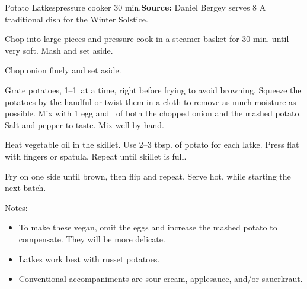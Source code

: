 \begin{recipe}{Potato Latkes}{pressure cooker \hfill 30 min.}{\textbf{Source:} Daniel Bergey \hfill serves 8}
  \freeform A traditional dish for the Winter Solstice.

Chop into large pieces and pressure cook in a steamer basket for 30 min. until very soft. Mash and set aside.

Chop onion finely and set aside.

Grate potatoes, 1--1\ at a time, right before frying to avoid browning. Squeeze the potatoes by the handful or twist them in a cloth to remove as much moisture as possible. Mix with 1 egg and \ of both the chopped onion and the mashed potato. Salt and pepper to taste. Mix well by hand.

\newstep Heat vegetable oil in the skillet. Use 2--3 tbsp. of potato for each latke. Press flat with fingers or spatula. Repeat until skillet is full.

\newstep Fry on one side until brown, then flip and repeat. Serve hot, while starting the next batch.

\freeform Notes:
\begin{itemize}
  \item To make these vegan, omit the eggs and increase the mashed potato to compensate. They will be more delicate.
  \item Latkes work best with russet potatoes.
  \item Conventional accompaniments are sour cream, applesauce, and/or sauerkraut.
\end{itemize}
\end{recipe}